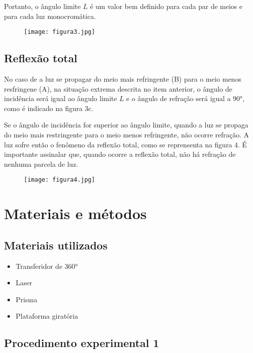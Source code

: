 \documentclass [a4paper, 12pt]{article}
\begin{document}
Portanto, o ângulo limite $L$ é um valor bem definido para cada par de meios e para cada luz monocromática.

\begin{figure}[!h]
\centering
{\texttt{[image: figura3.jpg]}}
\caption{\label{fig:figura2} \empty}
\end{figure}

\subsection{Reflexão total}

No caso de a luz se propagar do meio mais refringente (B) para o meio menos resfringene (A), na situação extrema descrita no item anterior, o ângulo de incidência será igual ao ângulo limite $L$ e o ângulo de refração será igual a $90$°, como é indicado na figura 3c.

Se o ângulo de incidência for superior ao ângulo limite, quando a luz se propaga do meio mais restringente para o meio menos refringente, não ocorre refração. A luz sofre então o fenômeno da reflexão total, como se reprensenta na figura 4. É importante assinalar que, quando ocorre a reflexão total, não há refração de nenhuma parcela de luz.

\begin{figure}[!h]
\centering
{\texttt{[image: figura4.jpg]}}
\caption{\label{fig:figura2} \empty}
\end{figure}

\section{Materiais e métodos}

\subsection{Materiais utilizados}

\begin{itemize}
    \item Transferidor de $360$°
    \item Laser
    \item Prisma
    \item Plataforma giratória
\end{itemize}

\subsection{Procedimento experimental 1}
\end{document}
